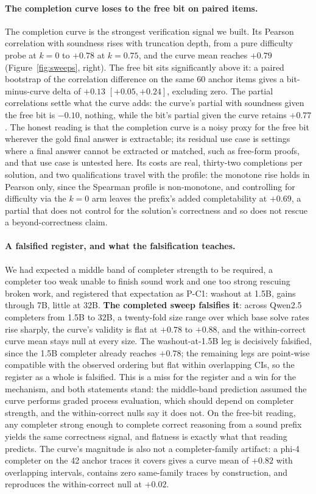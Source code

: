 \documentclass[11pt]{article}
\begin{document}
\paragraph{The completion curve loses to the free bit on paired items.}
The completion curve is the strongest verification signal we built.
Its Pearson correlation with soundness rises with truncation depth, from a pure difficulty probe at $k{=}0$ to $+0.78$ at $k{=}0.75$, and the curve mean reaches $+0.79$ (Figure~\ref{fig:sweeps}, right).
The free bit sits significantly above it: a paired bootstrap of the correlation difference on the same 60 anchor items gives a bit-minus-curve delta of $+0.13$ $[+0.05, +0.24]$, excluding zero.
The partial correlations settle what the curve adds: the curve's partial with soundness given the free bit is $-0.10$, nothing, while the bit's partial given the curve retains $+0.77$.
The honest reading is that the completion curve is a noisy proxy for the free bit wherever the gold final answer is extractable; its residual use case is settings where a final answer cannot be extracted or matched, such as free-form proofs, and that use case is untested here.
Its costs are real, thirty-two completions per solution, and two qualifications travel with the profile: the monotone rise holds in Pearson only, since the Spearman profile is non-monotone, and controlling for difficulty via the $k{=}0$ arm leaves the prefix's added completability at $+0.69$, a partial that does not control for the solution's correctness and so does not rescue a beyond-correctness claim.

\paragraph{A falsified register, and what the falsification teaches.}
We had expected a middle band of completer strength to be required, a completer too weak unable to finish sound work and one too strong rescuing broken work, and registered that expectation as P-C1: washout at 1.5B, gains through 7B, little at 32B.
\textbf{The completed sweep falsifies it}: across Qwen2.5 completers from 1.5B to 32B, a twenty-fold size range over which base solve rates rise sharply, the curve's validity is flat at $+0.78$ to $+0.88$, and the within-correct curve mean stays null at every size.
The washout-at-1.5B leg is decisively falsified, since the 1.5B completer already reaches $+0.78$; the remaining legs are point-wise compatible with the observed ordering but flat within overlapping CIs, so the register as a whole is falsified.
This is a miss for the register and a win for the mechanism, and both statements stand: the middle-band prediction assumed the curve performs graded process evaluation, which should depend on completer strength, and the within-correct nulls say it does not.
On the free-bit reading, any completer strong enough to complete correct reasoning from a sound prefix yields the same correctness signal, and flatness is exactly what that reading predicts.
The curve's magnitude is also not a completer-family artifact: a phi-4 completer on the 42 anchor traces it covers gives a curve mean of $+0.82$ with overlapping intervals, contains zero same-family traces by construction, and reproduces the within-correct null at $+0.02$.
\end{document}
